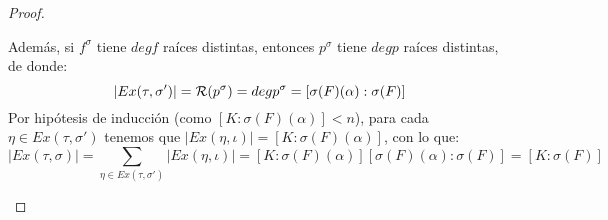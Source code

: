 \begin{prop}
\begin{proof}
\begin{itemize}
                Además, si $f^\sigma$ tiene $degf$ raíces distintas, entonces $p^\sigma$ tiene $degp$ raíces distintas, de donde:
                \begin{equation*}
                    |Ex(\tau,\sigma')| = \mathcal{R}(p^\sigma) = degp^{\sigma} = [\sigma(F)(\alpha):\sigma(F)]
                \end{equation*}
                Por hipótesis de inducción (como $[K:\sigma(F)(\alpha)]<n$), para cada $\eta \in Ex(\tau,\sigma')$ tenemos que $|Ex(\eta, \iota)| = [K:\sigma(F)(\alpha)]$, con lo que:
                \begin{equation*}
                    |Ex(\tau,\sigma)| = \sum_{\eta \in  Ex(\tau, \sigma')}|Ex(\eta,\iota)| = [K:\sigma(F)(\alpha)][\sigma(F)(\alpha):\sigma(F)] = [K:\sigma(F)]
                \end{equation*}
        \end{itemize}
    \end{proof}
\end{prop}

